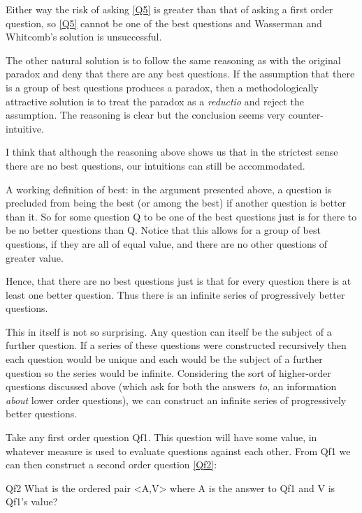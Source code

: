 Either way the risk of asking \ref{Q5} is greater than that of asking a first order question, so \ref{Q5} cannot be one of the best questions and Wasserman and Whitcomb's solution is unsuccessful.

The other natural solution is to follow the same reasoning as with the original paradox and deny that there are any best questions.
If the assumption that there is a group of best questions produces a paradox, then a methodologically attractive solution is to treat the paradox as a \textit{reductio} and reject the assumption.
The reasoning is clear but the conclusion seems very counter-intuitive.

I think that although the reasoning above shows us that in the strictest sense there are no best questions, our intuitions can still be accommodated.

A working definition of best: in the argument presented above, a question is precluded from being the best (or among the best) if another question is better than it.
So for some question Q to be one of the best questions just is for there to be no better questions than Q.
Notice that this allows for a group of best questions, if they are all of equal value, and there are no other questions of greater value.

Hence, that there are no best questions just is that for every question there is at least one better question.
Thus there is an infinite series of progressively better questions.

This in itself is not so surprising.
Any question can itself be the subject of a further question.
If a series of these questions were constructed recursively then each question would be unique and each would be the subject of a further question so the series would be infinite.
Considering the sort of higher-order questions discussed above (which ask for both the answers \emph{to}, an information \emph{about} lower order questions), we can construct an infinite series of progressively better questions.

Take any first order question Qf1.
This question will have some value, in whatever measure is used to evaluate questions against each other.
From Qf1 we can then construct a second order question \ref{Qf2}:

	\begin{principle}{Qf2}\label{Qf2}
	What is the ordered pair <A,V> where A is the answer to Qf1 and V is Qf1's value?\footnotemark
	\end{principle}

